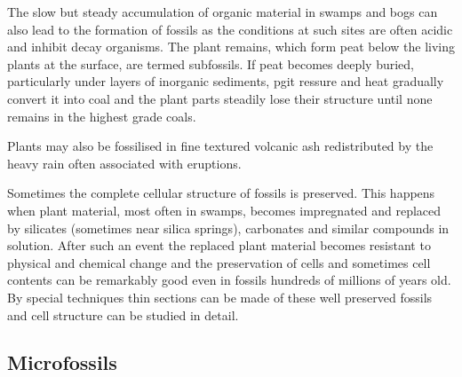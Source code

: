 The slow but steady accumulation of organic material in swamps and bogs can also lead to the formation of fossils as the conditions at such sites are often acidic and inhibit decay organisms.
The plant remains, which form peat below the living plants at the surface, are termed subfossils.
If peat becomes deeply buried, particularly under layers of inorganic sediments, pgit ressure and heat gradually convert it into coal and the plant parts steadily lose their structure until none remains in the highest grade coals.

Plants may also be fossilised in fine textured volcanic ash redistributed by the heavy rain often associated with eruptions.

Sometimes the complete cellular structure of fossils is preserved.
This happens when plant material, most often in swamps, becomes impregnated and replaced by silicates (sometimes near silica springs), carbonates and similar compounds in solution.
After such an event the replaced plant material becomes resistant to physical and chemical change and the preservation of cells and sometimes cell contents can be remarkably good even in fossils hundreds of millions of years old.
By special techniques thin sections can be made of these well preserved fossils and cell structure can be studied in detail.

\subsection{Microfossils}

